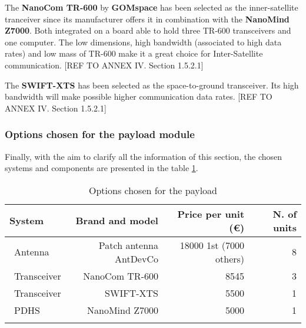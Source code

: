 The \textbf{NanoCom TR-600} by \textbf{GOMspace} has been selected as the inner-satellite tranceiver since its manufacturer offers it in combination with the \textbf{NanoMind Z7000}. Both integrated on a board able to hold three TR-600 transceivers and one computer. The low dimensions, high bandwidth (associated to high data rates) and low mass of TR-600 make it a great choice for Inter-Satellite communication. [{REF TO ANNEX IV. Section 1.5.2.1}]

The \textbf{SWIFT-XTS} has been selected as the space-to-ground transceiver. Its high bandwidth will make possible higher communication data rates. [{REF TO ANNEX IV. Section 1.5.2.1}]

\subsubsection{Options chosen for the payload module}

Finally, with the aim to clarify all the information of this section, the chosen systems and components are presented in the table \ref{payloadchosen}.

\begin{longtable}{| l | r | r | r |}
	\hline
	\rowcolor[gray]{0.80}	\textbf{System} &  \textbf{Brand and model}     & \textbf{Price per unit (\euro)} & \textbf{N. of units}  \\
	\hline
	\endfirsthead
	
	~Antenna & Patch antenna AntDevCo & 18000 1st (7000 others) & 8 \\
	~Transceiver & NanoCom TR-600 & 8545 & 3 \\
	~Transceiver & SWIFT-XTS & 5500 &1\\
	~PDHS & NanoMind Z7000 & 5000 & 1 \\
	\hline
	
\caption{Options chosen for the payload}
\label{payloadchosen}
\end{longtable}